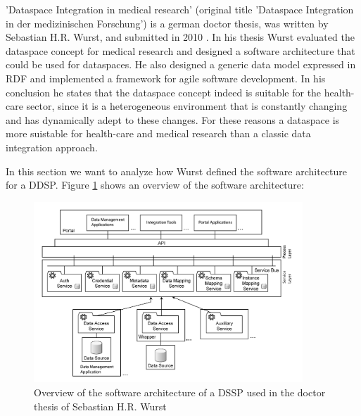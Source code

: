 'Dataspace Integration in medical research' (original title 'Dataspace Integration in der medizinischen Forschung') is a german doctor thesis, was written by Sebastian H.R. Wurst, and submitted in 2010 \cite{WurstDiss}. In his thesis Wurst evaluated the dataspace concept  for medical research and designed a software architecture that could be used for dataspaces. He also designed a generic data model expressed in RDF and implemented a framework for agile software development. 
In his conclusion he states that the dataspace concept indeed is suitable for the health-care sector, since it is a heterogeneous environment that is constantly changing and has dynamically adept to these changes. For these reasons a dataspace is more suistable for health-care and medical research than a classic data integration approach.

In this section we want to analyze how Wurst defined the software architecture for a DDSP. Figure \ref{SoftwareArchitectureDSSPWurst} shows an overview of the software architecture:

\begin{figure}[H]
	\begin{center}
		\includegraphics[width=0.9\textwidth]{figures/DataspaceIntegrationInDerMedForschungFigure31.PNG}
	\end{center}
	\caption{Overview of the software architecture of a DSSP used in the doctor thesis of Sebastian H.R. Wurst \cite[p. 117, Figure 31, english translation]{WurstDiss}}
	\label{SoftwareArchitectureDSSPWurst}
\end{figure}

